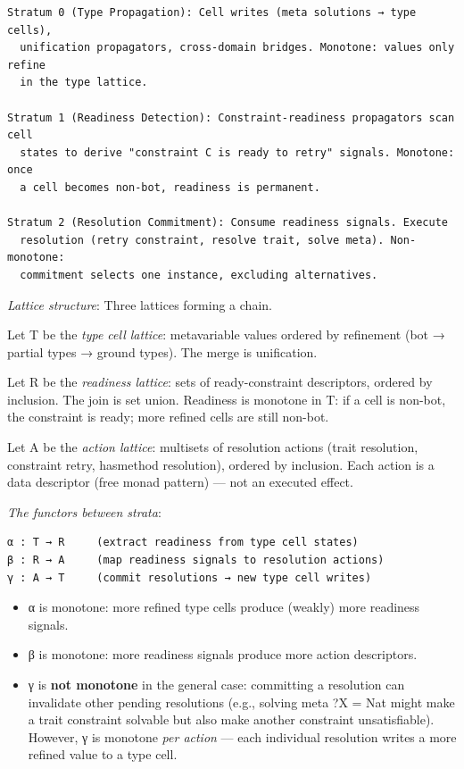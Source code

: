 \documentclass[11pt]{article}
\begin{document}
\begin{verbatim}
Stratum 0 (Type Propagation): Cell writes (meta solutions → type cells),
  unification propagators, cross-domain bridges. Monotone: values only refine
  in the type lattice.

Stratum 1 (Readiness Detection): Constraint-readiness propagators scan cell
  states to derive "constraint C is ready to retry" signals. Monotone: once
  a cell becomes non-bot, readiness is permanent.

Stratum 2 (Resolution Commitment): Consume readiness signals. Execute
  resolution (retry constraint, resolve trait, solve meta). Non-monotone:
  commitment selects one instance, excluding alternatives.
\end{verbatim}

\emph{Lattice structure}: Three lattices forming a chain.

Let T be the \emph{type cell lattice}: metavariable values ordered by refinement
(bot → partial types → ground types). The merge is unification.

Let R be the \emph{readiness lattice}: sets of ready-constraint descriptors, ordered
by inclusion. The join is set union. Readiness is monotone in T: if a cell is
non-bot, the constraint is ready; more refined cells are still non-bot.

Let A be the \emph{action lattice}: multisets of resolution actions (trait
resolution, constraint retry, hasmethod resolution), ordered by inclusion. Each
action is a data descriptor (free monad pattern) — not an executed effect.

\emph{The functors between strata}:

\begin{verbatim}
α : T → R     (extract readiness from type cell states)
β : R → A     (map readiness signals to resolution actions)
γ : A → T     (commit resolutions → new type cell writes)
\end{verbatim}

\begin{itemize}
\item α is monotone: more refined type cells produce (weakly) more readiness
signals.
\item β is monotone: more readiness signals produce more action descriptors.
\item γ is \textbf{not monotone} in the general case: committing a resolution can
invalidate other pending resolutions (e.g., solving meta ?X = Nat might
make a trait constraint solvable but also make another constraint
unsatisfiable). However, γ is monotone \emph{per action} — each individual
resolution writes a more refined value to a type cell.
\end{itemize}
\end{document}
